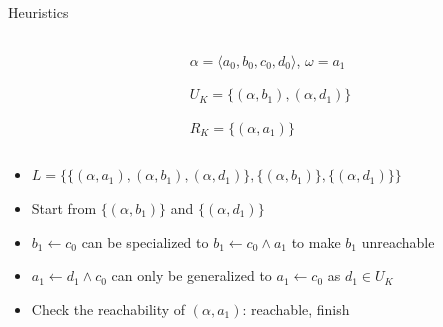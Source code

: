 \documentclass[8pt]{beamer}
\begin{document}
\begin{frame}{Heuristics}
\begin{columns}
\begin{column}{0.6\textwidth}

\end{column}
\begin{column}{0.4\textwidth}
    $\alpha=\langle a_0,b_0,c_0,d_0\rangle$, $\omega=a_1$
    
	$U_K=\{(\alpha,b_1),(\alpha,d_1)\}$
	
	$R_K=\{(\alpha,a_1)\}$
\end{column}
\end{columns}

        \vspace{0.5cm}
        \centering
        
        
        \vspace{0.5cm}
    
     \begin{itemize}
        \item $L=\{\{(\alpha,a_1),(\alpha,b_1),(\alpha,d_1)\},\{(\alpha,b_1)\},\{(\alpha,d_1)\}\}$
        \item Start from $\{(\alpha,b_1)\}$ and $\{(\alpha,d_1)\}$
        \item $b_1\gets c_0$ can be specialized to $b_1\gets c_0\land a_1$ to make $b_1$ unreachable
        \item $a_1\gets d_1 \land c_0$ can only be generalized to $a_1 \gets c_0$ as $d_1\in U_K$
        \item Check the reachability of $(\alpha,a_1)$: reachable, finish
    \end{itemize}
\end{frame}
\end{document}
